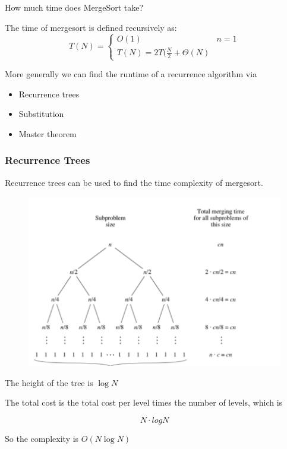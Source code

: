 \documentclass[../notes.tex]{subfiles}
\begin{document}
How much time does MergeSort take?


The time of mergesort is defined recursively as:
\begin{equation}
	T(N) = \begin{cases}
		O(1) & n = 1 \\
		T(N) = 2T(\frac{N}{2} + \Theta(N)
	\end{cases}
\end{equation}


More generally we can find the runtime of a recurrence algorithm via
\begin{itemize}
	\item Recurrence trees
	\item Substitution
	\item Master theorem
\end{itemize}


\subsubsection{Recurrence Trees}
\begin{example}
Recurrence trees can be used to find the time complexity of mergesort.
\begin{figure}[H]
	\centering
	\includegraphics[width=0.8\linewidth]{img/image_2022-09-19-12-26-07.png}
\end{figure}

The height of the tree is $ \log N$ 

The total cost is the total cost per level times the number of levels, which is 

\begin{equation}
	N \cdot  logN
\end{equation}

So the complexity is $ O(N\log N) $ 
	
\end{example}
\end{document}
